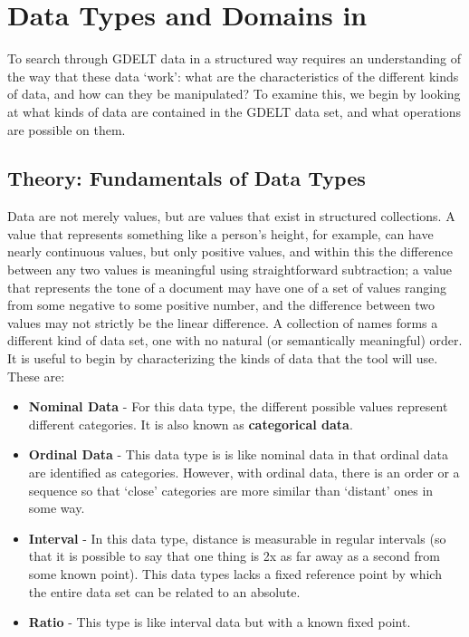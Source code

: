 
\chapter{Data Types and Domains in \gdgas} \label{chap:DataTypesAndDomains}

To search through GDELT data in a structured way requires an understanding of the way that these data `work': what are the characteristics of the different kinds of data, and how can they be manipulated? To examine this, we begin by looking at what kinds of data are contained in the GDELT data set, and what operations are possible on them.

\section{Theory: Fundamentals of Data Types}

Data are not merely values, but are values that exist in structured collections. A value that represents something like a person's height, for example, can have nearly continuous values, but only positive values, and within this the difference between any two values is meaningful using straightforward subtraction; a value that represents the tone of a document may have one of a set of values ranging from some negative to some positive number, and the difference between two values may not strictly be the linear difference. A collection of names forms a different kind of data set, one with no natural (or semantically meaningful) order. It is useful to begin by characterizing the kinds of data that the \gdgas tool will use. These are: 

\begin{itemize}
  \item \textbf{Nominal Data} - For this data type, the different possible values represent different categories. It is also known as \textbf{categorical data}.
  \item \textbf{Ordinal Data} - This data type is is like nominal data in that ordinal data are identified as categories.  However, with ordinal data, there is an order or a sequence so that `close' categories are more similar than `distant' ones in some way.
  \item \textbf{Interval} - In this data type, distance is measurable in regular intervals (so that it is possible to say that one thing is 2x as far away as a second from some known point). This data types lacks a fixed reference point by which the entire data set can be related to an absolute.
  \item \textbf{Ratio} - This type is like interval data but with a known fixed point.
\end{itemize}

